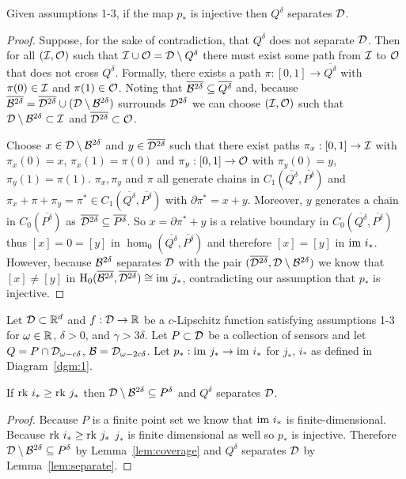 \begin{lemma}\label{lem:separate}
    Given assumptions 1-3, if the map $p_*$ is injective then $Q^\delta$ separates ${\mathcal{D}}$.
\end{lemma}
\begin{proof}
    Suppose, for the sake of contradiction, that $Q^\delta$ does not separate ${\mathcal{D}}$.
    Then for all $({\mathcal{I}}, \mathcal{O})$ such that ${\mathcal{I}} \cup \mathcal{O} = {\mathcal{D}}\setminus Q^\delta$ there must exist some path from ${\mathcal{I}}$ to $\mathcal{O}$ that does not cross $Q^\delta$.
    Formally, there exists a path $\pi : [0,1]\to\overline{Q^\delta}$ with $\pi(0)\in {\mathcal{I}}$ and $\pi(1)\in\mathcal{O}$.
    Noting that $\overline{{\mathcal{B}}^{2\delta}}\subseteq \overline{Q^\delta}$ and, because $\overline{{\mathcal{B}}^{2\delta}} = \overline{{\mathcal{D}}^{2\delta}}\cup ({\mathcal{D}}\setminus{\mathcal{B}}^{2\delta})$ surrounds ${\mathcal{D}}^{2\delta}$ we can choose $({\mathcal{I}}, \mathcal{O})$ such that ${\mathcal{D}}\setminus {\mathcal{B}}^{2\delta}\subset {\mathcal{I}}$ and $\overline{{\mathcal{D}}^{2\delta}}\subset \mathcal{O}$.

    Choose $x\in{\mathcal{D}}\setminus {\mathcal{B}}^{2\delta}$ and $y\in \overline{{\mathcal{D}}^{2\delta}}$ such that there exist paths $\pi_x : [0,1]\to {\mathcal{I}}$ with $\pi_x(0) = x$, $\pi_x(1) = \pi(0)$ and $\pi_y : [0,1]\to \mathcal{O}$ with $\pi_y(0) = y$, $\pi_y(1) = \pi(1)$.
    $\pi_x, \pi_y$ and $\pi$ all generate chains in $C_1(\overline{Q^\delta}, \overline{P^\delta})$ and $\pi_x + \pi + \pi_y = \pi^*\in C_1(\overline{Q^\delta}, \overline{P^\delta})$ with $\partial\pi^* = x + y$.
    Moreover, $y$ generates a chain in $C_0(\overline{P^\delta})$ as $\overline{{\mathcal{D}}^{2\delta}}\subseteq\overline{P^\delta}$.
    So $x = \partial\pi^* + y$ is a relative boundary in $C_0(\overline{Q^\delta}, \overline{P^\delta})$ thus $[x] = 0 = [y]$ in $\hom_0(\overline{Q^\delta}, \overline{P^\delta})$ and therefore $[x] = [y]$ in $\mathrm{im}~i_*$.
    However, because ${\mathcal{B}}^{2\delta}$ separates ${\mathcal{D}}$ with the pair $(\overline{{\mathcal{D}}^{2\delta}}, {\mathcal{D}}\setminus{\mathcal{B}}^{2\delta})$ we know that $[x]\neq [y]$ in $\mathrm{H}_0(\overline{{\mathcal{B}}^{2\delta}}, \overline{{\mathcal{D}}^{2\delta}})\cong \mathrm{im}~j_*$, contradicting our assumption that $p_*$ is injective.
\end{proof}

\begin{theorem}\label{thm:tcc}
    Let ${\mathcal{D}}\subset\mathbb{R}^d$ and $f:{\mathcal{D}}\to\mathbb{R}$ be a $c$-Lipschitz function satisfying assumptions 1-3 for $\omega\in\mathbb{R}$, $\delta > 0$, and $\gamma > 3\delta$.
    Let $P\subset{\mathcal{D}}$ be a collection of sensors and let $Q = P\cap {\mathcal{D}}_{\omega - c\delta}$, ${\mathcal{B}} = {\mathcal{D}}_{\omega - 2c\delta}$.
    Let $p_* : \mathrm{im}~j_*\to\mathrm{im}~i_*$ for $j_*$, $i_*$ as defined in Diagram~\ref{dgm:1}.

    If $\mathrm{rk}~i_*\geq \mathrm{rk}~j_*$ then ${\mathcal{D}}\setminus{\mathcal{B}}^{2\delta}\subseteq P^\delta$ and $Q^\delta$ separates ${\mathcal{D}}$.
\end{theorem}
\begin{proof}
    Because $P$ is a finite point set we know that $\mathrm{im}~i_*$ is finite-dimensional.
    Because $\mathrm{rk}~i_*\geq \mathrm{rk}~j_*$ $j_*$ is finite dimensional as well so $p_*$ is injective.
    Therefore ${\mathcal{D}}\setminus{\mathcal{B}}^{2\delta}\subseteq P^\delta$ by Lemma~\ref{lem:coverage} and $Q^\delta$ separates ${\mathcal{D}}$ by Lemma~\ref{lem:separate}.
\end{proof}
